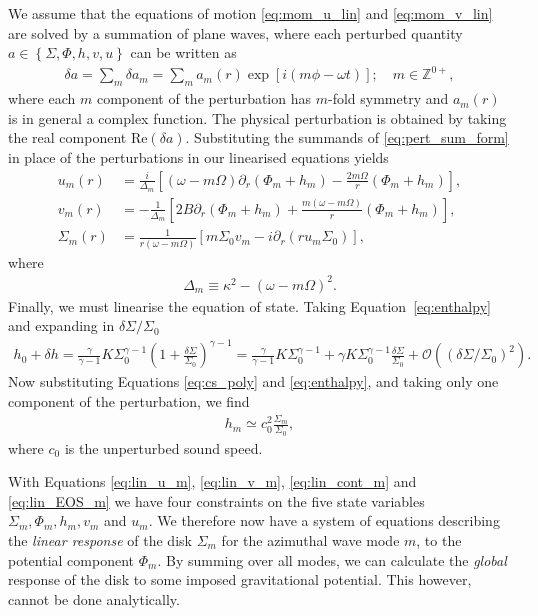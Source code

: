 We assume that the equations of motion \eqref{eq:mom_u_lin} and \eqref{eq:mom_v_lin} are solved by a summation of plane waves, where each perturbed quantity $a \in \left\{ \Sigma, \Phi, h, v, u \right\}$ can be written as
\begin{align}
    \delta a = \sum_m \delta a_m = \sum_m a_m(r) \exp \left[ i (m\phi - \omega t) \right]; \quad m \in \mathbb{Z}^{0+}, \label{eq:pert_sum_form}
\end{align}
where each $m$ component of the perturbation has $m$-fold symmetry and $a_m(r)$ is in general a complex function.
The physical perturbation is obtained by taking the real component $\mathrm{Re}(\delta a)$.
Substituting the summands of \eqref{eq:pert_sum_form} in place of the perturbations in our linearised equations yields
\begin{align}
    u_m (r) &= \frac{i}{\Delta_m} \left[ (\omega - m \Omega) \partial_r (\Phi_m + h_m) - \frac{2 m \Omega}{r} (\Phi_m + h_m) \right] \label{eq:lin_u_m}, \\
    v_m (r) &= - \frac{1}{\Delta_m} \left[ 2B \partial_r (\Phi_m + h_m) + \frac{m(\omega - m \Omega)}{r} (\Phi_m + h_m) \right] \label{eq:lin_v_m}, \\
    \Sigma_m (r) &= \frac{1}{r(\omega - m \Omega)} \left[ m \Sigma_0 v_m -i \partial_r (r u_m \Sigma_0) \right] \label{eq:lin_cont_m},
\end{align}
where
\begin{align}
    \Delta_m \equiv \kappa^2 - (\omega - m \Omega)^2. \label{eq:def_delta_m}
\end{align}
Finally, we must linearise the equation of state.
Taking Equation~\eqref{eq:enthalpy} and expanding in $\delta \Sigma / \Sigma_0$
\begin{align}
    h_0 + \delta h = \frac{\gamma}{\gamma - 1} K \Sigma_0^{\gamma - 1}(1 + \frac{\delta\Sigma}{\Sigma_0})^{\gamma-1} = \frac{\gamma}{\gamma - 1} K \Sigma_0^{\gamma - 1} + \gamma K \Sigma_0^{\gamma-1} \frac{\delta\Sigma}{\Sigma_0} + \mathcal{O}(\left(\delta\Sigma / \Sigma_0\right)^2).
\end{align}
Now substituting Equations \eqref{eq:cs_poly} and \eqref{eq:enthalpy}, and taking only one component of the perturbation, we find
\begin{align}
    h_m \simeq c_0^2 \frac{\Sigma_m}{\Sigma_0}, \label{eq:lin_EOS_m}
\end{align}
where $c_0$ is the unperturbed sound speed.

With Equations \eqref{eq:lin_u_m}, \eqref{eq:lin_v_m}, \eqref{eq:lin_cont_m} and \eqref{eq:lin_EOS_m} we have four constraints on the five state variables $\Sigma_m, \Phi_m, h_m, v_m$ and $u_m$.
We therefore now have a system of equations describing the \textit{linear response} of the disk $\Sigma_m$ for the azimuthal wave mode $m$, to the potential component $\Phi_m$.
By summing over all modes, we can calculate the \textit{global} response of the disk to some imposed gravitational potential.
This however, cannot be done analytically.

